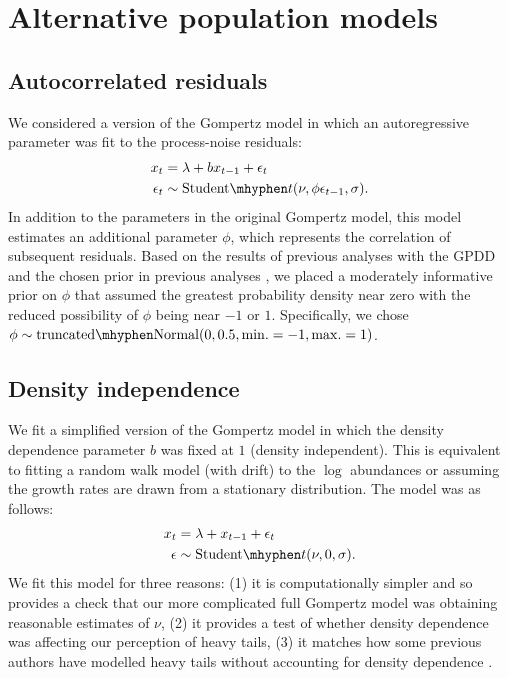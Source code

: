 \documentclass[12pt]{article}
\begin{document}
\section{Alternative population models}

\subsection{Autocorrelated residuals} We considered a version of the Gompertz
model in which an autoregressive parameter was fit to the process-noise
residuals:
\begin{align}
x_t &= \lambda + b x_{t-1} + \epsilon_t\\
\epsilon_t &\sim \mathrm{Student}\mhyphen t(\nu, \phi \epsilon_{t-1}, \sigma).
\end{align}
In addition to the parameters in the original Gompertz model, this model
estimates an additional parameter \(\phi\), which represents the correlation of
subsequent residuals. Based on the results of previous analyses with the
GPDD \citep{connors2014} and the chosen prior in previous
analyses \citep{thorson2014a}, we placed a moderately informative prior on
\(\phi\) that assumed the greatest probability density near zero with the
reduced possibility of \(\phi\) being near \(-1\) or \(1\). Specifically, we
chose \(\phi \sim \mathrm{truncated\mhyphen Normal}(0, 0.5, \mathrm{min.} = -1,
\mathrm{max.} = 1)\).

\subsection{Density independence} We fit a simplified version of the
Gompertz model in which the density dependence parameter \(b\) was fixed at
\(1\) (density independent). This is equivalent to fitting a random walk model
(with drift) to the \(\log\) abundances or assuming the growth rates are drawn
from a stationary distribution. The model was as follows:
\begin{align}
x_t &= \lambda + x_{t-1} + \epsilon_t\\
\epsilon &\sim \mathrm{Student}\mhyphen t(\nu, 0, \sigma).
\end{align}
We fit this model for three reasons: (1) it is computationally simpler and so
provides a check that our more complicated full Gompertz model was obtaining
reasonable estimates of \(\nu\), (2) it provides a test of whether density
dependence was affecting our perception of heavy tails, (3) it
matches how some previous authors have modelled heavy tails without accounting
for density dependence \citep{segura2013}.
\end{document}
